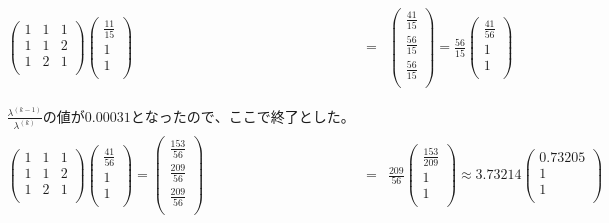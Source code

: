 \documentclass[a4j,twoside,openright,11pt]{jsarticle}
\begin{document}
\begin{eqnarray}
  \left(
    \begin{array}{rrr}
      1 & 1 & 1 \\
      1 & 1 & 2 \\
      1 & 2 & 1 \\
    \end{array}
  \right)
  \left(
    \begin{array}{r}
      \frac{11}{15} \\
      1 \\
      1 \\
    \end{array}
  \right)&=&
  \left(
    \begin{array}{r}
      \frac{41}{15} \\
      \frac{56}{15} \\
      \frac{56}{15} \\
    \end{array}
  \right)=\frac{56}{15}
  \left(
    \begin{array}{r}
      \frac{41}{56} \\
      1 \\
      1 \\
    \end{array}
  \right)
\nonumber
\\
\nonumber\\
\nonumber\\
\frac{\lambda^{(k-1)}}{\lambda^{(k)}}の値が0.00031となったので、ここで終了とした。\nonumber
\\
  \left(
    \begin{array}{rrr}
      1 & 1 & 1 \\
      1 & 1 & 2 \\
      1 & 2 & 1 \\
    \end{array}
  \right)
  \left(
    \begin{array}{r}
      \frac{41}{56} \\
      1 \\
      1 \\
    \end{array}
  \right)=
  \left(
    \begin{array}{r}
      \frac{153}{56} \\
      \frac{209}{56} \\
      \frac{209}{56} \\
    \end{array}
  \right)&=&\frac{209}{56}
  \left(
    \begin{array}{r}
      \frac{153}{209} \\
      1 \\
      1 \\
    \end{array}
  \right) \approx 3.73214
  \left(
    \begin{array}{r}
      0.73205 \\
      1 \\
      1 \\
    \end{array}
  \right)
\end{eqnarray}
\end{document}
